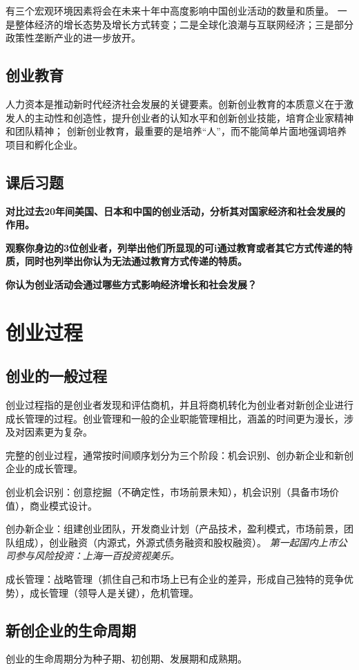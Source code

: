 \documentclass[a4paper, UTF8]{ctexart}
\begin{document}
		有三个宏观环境因素将会在未来十年中高度影响中国创业活动的数量和质量。
		一是整体经济的增长态势及增长方式转变；二是全球化浪潮与互联网经济；三是部分政策性垄断产业的进一步放开。
	
	\subsection{创业教育}
		人力资本是推动新时代经济社会发展的关键要素。创新创业教育的本质意义在于激发人的主动性和创造性，提升创业者的认知水平和创新创业技能，培育企业家精神和团队精神；
		创新创业教育，最重要的是培养“人”，而不能简单片面地强调培养项目和孵化企业。

	\subsection{课后习题}
		\textbf{对比过去20年间美国、日本和中国的创业活动，分析其对国家经济和社会发展的作用。}



		\textbf{观察你身边的3位创业者，列举出他们所显现的可i通过教育或者其它方式传递的特质，同时也列举出你认为无法通过教育方式传递的特质。}



		\textbf{你认为创业活动会通过哪些方式影响经济增长和社会发展？}


\section{创业过程}
	\subsection{创业的一般过程}
		创业过程指的是创业者发现和评估商机，并且将商机转化为创业者对新创企业进行成长管理的过程。创业管理和一般的企业职能管理相比，涵盖的时间更为漫长，涉及对因素更为复杂。

		完整的创业过程，通常按时间顺序划分为三个阶段：机会识别、创办新企业和新创企业的成长管理。

		创业机会识别：创意挖掘（不确定性，市场前景未知），机会识别（具备市场价值），商业模式设计。

		创办新企业：组建创业团队，开发商业计划（产品技术，盈利模式，市场前景，团队组成），创业融资（内源式，外源式债务融资和股权融资）。
		\emph{第一起国内上市公司参与风险投资：上海一百投资视美乐。}

		成长管理：战略管理（抓住自己和市场上已有企业的差异，形成自己独特的竞争优势），成长管理（领导人是关键），危机管理。

	\subsection{新创企业的生命周期}
		创业的生命周期分为种子期、初创期、发展期和成熟期。
\end{document}

